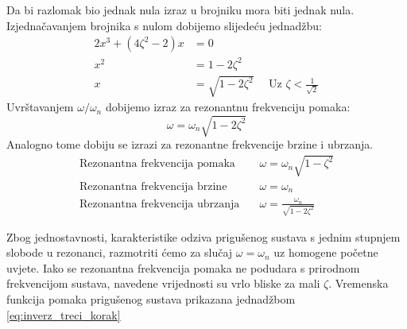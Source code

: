 Da bi razlomak bio jednak nula izraz u brojniku mora biti jednak nula.
Izjednačavanjem brojnika s nulom dobijemo slijedeću jednadžbu:
\[
    \begin{aligned}
        2x^3+(4\zeta^2-2)x &= 0\\
        x^2 &= 1-2\zeta^2\\
        x &= \sqrt{1-2\zeta^2} \quad \text{ Uz } \zeta < \frac{1}{\sqrt{2}}
    \end{aligned}
\]
Uvrštavanjem $\omega/\omega_n$ dobijemo izraz za rezonantnu frekvenciju pomaka:
\begin{equation}\label{eq:rezonantna_frekvencija_pomak}
    \omega=\omega_n\sqrt{1-2\zeta^2}
\end{equation}
Analogno tome dobiju se izrazi za rezonantne frekvencije brzine i ubrzanja.
\begin{align}
    \text{Rezonantna frekvencija pomaka}\quad & \omega = \omega_n\sqrt{1-\zeta^2}\label{eq:rd_rezonanca}\\
    \text{Rezonantna frekvencija brzine}\quad & \omega = \omega_n\label{eq:rv_rezonanca}\\
    \text{Rezonantna frekvencija ubrzanja}\quad & \omega = \frac{\omega_n}{\sqrt{1-2\zeta^2}}\label{eq:ra_rezonanca}
\end{align}

Zbog jednostavnosti, karakteristike odziva prigušenog sustava s jednim stupnjem
slobode u rezonanci, razmotriti ćemo za slučaj $\omega = \omega_n$ uz
homogene početne uvjete. Iako se rezonantna frekvencija pomaka ne podudara s 
prirodnom frekvencijom sustava, navedene vrijednosti su vrlo bliske za mali $\zeta$. 
Vremenska funkcija pomaka prigušenog sustava prikazana jednadžbom \eqref{eq:inverz_treci_korak}

